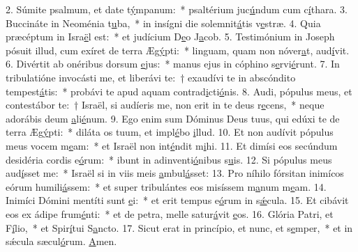 2. Súmite psalmum, et date t\uline{ý}mpanum:~* psaltérium juc\uline{ú}ndum cum c\uline{í}thara.
3. Buccináte in Neoménia t\uline{u}ba,~* in insígni die solemnit\uline{á}tis v\uline{e}stræ.
4. Quia præcéptum in Isra\uline{ë}l est:~* et judícium D\uline{e}o J\uline{a}cob.
5. Testimónium in Joseph pósuit illud, cum exíret de terra Æg\uline{ý}pti:~* linguam, quam non nóver\uline{a}t, aud\uline{í}vit.
6. Divértit ab onéribus dorsum \uline{e}jus:~* manus ejus in cóphino s\uline{e}rvi\uline{é}runt.
7. In tribulatióne invocásti me, et liberávi te:~† exaudívi te in abscóndito tempest\uline{á}tis:~* probávi te apud aquam contrad\uline{i}cti\uline{ó}nis.
8. Audi, pópulus meus, et contestábor te:~† Israël, si audíeris me, non erit in te deus r\uline{e}cens,~* neque adorábis deum \uline{a}li\uline{é}num.
9. Ego enim sum Dóminus Deus tuus, qui edúxi te de terra Æg\uline{ý}pti:~* diláta os tuum, et impl\uline{é}bo \uline{i}llud.
10. Et non audívit pópulus meus vocem m\uline{e}am:~* et Israël non int\uline{é}ndit m\uline{i}hi.
11. Et dimísi eos secúndum desidéria cordis e\uline{ó}rum:~* ibunt in adinventi\uline{ó}nibus s\uline{u}is.
12. Si pópulus meus aud\uline{í}sset me:~* Israël si in viis meis \uline{a}mbul\uline{á}sset:
13. Pro níhilo fórsitan inimícos eórum humili\uline{á}ssem:~* et super tribulántes eos misíssem m\uline{a}num m\uline{e}am.
14. Inimíci Dómini mentíti sunt \uline{e}i:~* et erit tempus e\uline{ó}rum in s\uline{ǽ}cula.
15. Et cibávit eos ex ádipe frum\uline{é}nti:~* et de petra, melle satur\uline{á}vit \uline{e}os.
16. Glória Patri, et F\uline{í}lio,~* et Spir\uline{í}tui S\uline{a}ncto.
17. Sicut erat in princípio, et nunc, et s\uline{e}mper,~* et in sǽcula sæcul\uline{ó}rum. \uline{A}men.
